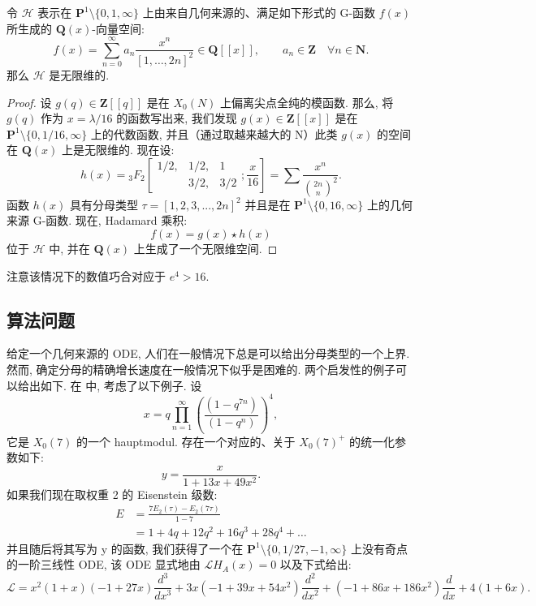 \begin{proposition}\label{prop:15.4.3}
令 \(\mathcal{H}\) 表示在 \(\mathbf{P}^1 \setminus \{0,1,\infty\}\) 
上由来自几何来源的、满足如下形式的 G-函数 \(f(x)\) 
所生成的 \(\mathbf{Q}(x)\)-向量空间:
\begin{equation}\label{eq:15.4.4}
f(x) = \sum_{n=0}^{\infty} a_n \frac{x^n}{[1, \dots, 2n]^2} \in \mathbf{Q}[\![x]\!], \qquad a_n \in \mathbf{Z} \quad \forall n \in \mathbf{N}.
\end{equation}
那么 \(\mathcal{H}\) 是无限维的.
\end{proposition}

\begin{proof}
设 \(g(q) \in \mathbf{Z}[\![q]\!]\) 是在 \(X_0(N)\) 上偏离尖点全纯的模函数. 
那么, 将 \(g(q)\) 作为 \(x = \lambda/16\) 的函数写出来, 
我们发现 \(g(x) \in \mathbf{Z}[\![x]\!]\) 是在 \(\mathbf{P}^1 \setminus \{0, 1/16, \infty\}\) 
上的代数函数, 
并且（通过取越来越大的 N）此类 \(g(x)\) 的空间在 \(\mathbf{Q}(x)\) 
上是无限维的. 
现在设:
\[ h(x) = {}_{3}F_{2}\left[\begin{smallmatrix} 1/2, & 1/2, & 1 \\ & 3/2, & 3/2 \end{smallmatrix} ; \frac{x}{16}\right] = \sum \frac{x^{n}}{\binom{2n}{n}^{2}}. \]
函数 \(h(x)\) 具有分母类型 \(\tau = [1, 2, 3, ..., 2n]^2\) 
并且是在 \(\mathbf{P}^1 \setminus \{0, 16, \infty\}\) 上的几何来源 G-函数. 
现在, Hadamard 乘积:
\[ f(x) = g(x) \star h(x) \]
位于 \(\mathcal{H}\) 中, 并在 \(\mathbf{Q}(x)\) 
上生成了一个无限维空间.
\end{proof}

注意该情况下的数值巧合对应于 \(e^4 > 16\).

\subsection{算法问题}\label{sec:15.5}

给定一个几何来源的 ODE, 人们在一般情况下总是可以给出分母类型的一个上界. 
然而, 确定分母的精确增长速度在一般情况下似乎是困难的. 
两个启发性的例子可以给出如下. 
在 \cite{Coo12} 中, 考虑了以下例子. 
设
\[ x = q \prod_{n=1}^{\infty} \left( \frac{(1-q^{7n})}{(1-q^n)} \right)^4, \]
它是 \(X_0(7)\) 的一个 hauptmodul. 
存在一个对应的、关于 \(X_0(7)^+\) 的统一化参数如下:
\[ y = \frac{x}{1 + 13x + 49x^2}. \]
如果我们现在取权重 2 的 Eisenstein 级数:
\[
\begin{aligned}
E &= \frac{7E_2(\tau) - E_2(7\tau)}{1 - 7} \\
&= 1 + 4q + 12q^2 + 16q^3 + 28q^4 + \dots
\end{aligned}
\]
并且随后将其写为 y 的函数, 
我们获得了一个在 \(\mathbf{P}^1 \setminus \{0, 1/27, -1, \infty\}\) 
上没有奇点的一阶三线性 ODE, 该 ODE 显式地由 \(\mathcal{L}H_A(x) = 0\) 
以及下式给出:
\[ \mathcal{L} = x^{2}(1+x)(-1+27x)\frac{d^{3}}{dx^{3}} + 3x(-1+39x+54x^{2})\frac{d^{2}}{dx^{2}} + (-1+86x+186x^{2})\frac{d}{dx} + 4(1+6x). \]

